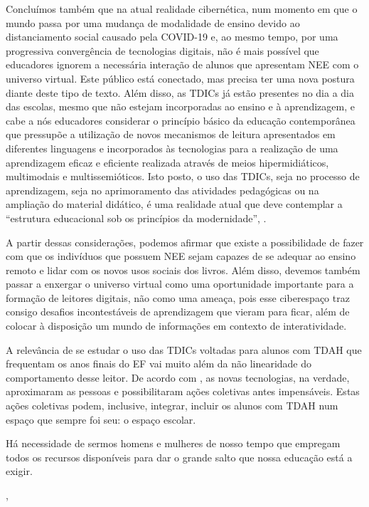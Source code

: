 \documentclass{textolivre}
\begin{document}
Concluímos também que na atual realidade cibernética, num momento em que o mundo passa por uma mudança de modalidade de ensino devido ao distanciamento social causado pela COVID-19 e, ao mesmo tempo, por uma progressiva convergência de tecnologias digitais, não é mais possível que educadores ignorem a necessária interação de alunos que apresentam NEE com o universo virtual. Este público está conectado, mas precisa ter uma nova postura diante deste tipo de texto. Além disso, as TDICs já estão presentes no dia a dia das escolas, mesmo que não estejam incorporadas ao ensino e à aprendizagem, e cabe a nós educadores considerar o princípio básico da educação contemporânea que pressupõe a utilização de novos mecanismos de leitura apresentados em diferentes linguagens e incorporados às tecnologias para a realização de uma aprendizagem eficaz e eficiente realizada através de meios hipermidiáticos, multimodais e multissemióticos. Isto posto, o uso das TDICs, seja no processo de aprendizagem, seja no aprimoramento das atividades pedagógicas ou na ampliação do material didático, é uma realidade atual que deve contemplar a “estrutura educacional sob os princípios da modernidade”, \textcite{melo_midia_2008}. 

A partir dessas considerações, podemos afirmar que existe a possibilidade de fazer com que os indivíduos que possuem NEE sejam capazes de se adequar ao ensino remoto e lidar com os novos usos sociais dos livros. Além disso, devemos também passar a enxergar o universo virtual como uma oportunidade importante para a formação de leitores digitais, não como uma ameaça, pois esse ciberespaço traz consigo desafios incontestáveis de aprendizagem que vieram para ficar, além de colocar à disposição um mundo de informações em contexto de interatividade. 

A relevância de se estudar o uso das TDICs voltadas para alunos com TDAH que frequentam os anos finais do EF vai muito além da não linearidade do comportamento desse leitor. De acordo com \textcite{tori_educacao_2010}, as novas tecnologias, na verdade, aproximaram as pessoas e possibilitaram ações coletivas antes impensáveis. Estas ações coletivas podem, inclusive, integrar, incluir os alunos com TDAH num espaço que sempre foi seu: o espaço escolar.

\epigraph{Há necessidade de sermos homens e mulheres de nosso tempo que empregam todos os recursos disponíveis para dar o grande salto que nossa educação está a exigir.}{, \textit{}}

\printbibliography\label{sec-bib}
\end{document}
